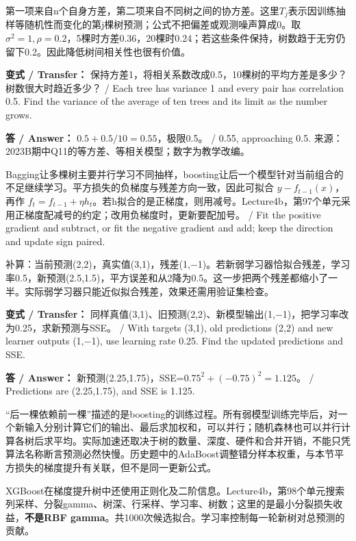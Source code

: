 第一项来自n个自身方差，第二项来自不同树之间的协方差。这里\(T_j\)表示因训练抽样等随机性而变化的第j棵树预测；公式不把偏差或观测噪声算成0。取\(\sigma^2=1,\rho=0.2\)，5棵时方差0.36，20棵时0.24；若这些条件保持，树数趋于无穷仍留下0.2。因此降低树间相关性也很有价值。


\textbf{变式 / Transfer：} 保持方差1，将相关系数改成0.5，10棵树的平均方差是多少？树数很大时趋近多少？ / Each tree has variance 1 and every pair has correlation 0.5. Find the variance of the average of ten trees and its limit as the number grows.


\textbf{答 / Answer：} \(0.5+0.5/10=0.55\)，极限0.5。 / 0.55, approaching 0.5. 来源：2023B期中Q11的等方差、等相关模型；数字为教学改编。





Bagging让多棵树主要并行学习不同抽样，boosting让后一个模型针对当前组合的不足继续学习。平方损失的负梯度与残差方向一致，因此可拟合 \(y-f_{t-1}(x)\)，再作 \(f_t=f_{t-1}+\eta h_t\)。若h拟合的是正梯度，则用减号。Lecture4b，第97个单元采用正梯度配减号的约定；改用负梯度时，更新要配加号。 / Fit the positive gradient and subtract, or fit the negative gradient and add; keep the direction and update sign paired.


补算：当前预测(2,2)，真实值(3,1)，残差(1,\ensuremath{-}1)。若新弱学习器恰拟合残差，学习率0.5，新预测(2.5,1.5)，平方误差和从2降为0.5。这一步把两个残差都缩小了一半。实际弱学习器只能近似拟合残差，效果还需用验证集检查。


\textbf{变式 / Transfer：} 同样真值(3,1)、旧预测(2,2)、新模型输出(1,\ensuremath{-}1)，把学习率改为0.25，求新预测与SSE。 / With targets (3,1), old predictions (2,2) and new learner outputs (1,\ensuremath{-}1), use learning rate 0.25. Find the updated predictions and SSE.


\textbf{答 / Answer：} 新预测(2.25,1.75)，SSE=\(0.75^2+(-0.75)^2=1.125\)。 / Predictions are (2.25,1.75), and SSE is 1.125.


“后一棵依赖前一棵”描述的是boosting的训练过程。所有弱模型训练完毕后，对一个新输入分别计算它们的输出、最后求加权和，可以并行；随机森林也可以并行计算各树后求平均。实际加速还取决于树的数量、深度、硬件和合并开销，不能只凭算法名称断言预测必然快慢。历史题中的AdaBoost调整错分样本权重，与本节平方损失的梯度提升有关联，但不是同一更新公式。


XGBoost在梯度提升树中还使用正则化及二阶信息。Lecture4b，第98个单元搜索列采样、分裂gamma、树深、行采样、学习率、树数；这里的是最小分裂损失收益，\textbf{不是RBF gamma}。共1000次候选拟合。学习率控制每一轮新树对总预测的贡献。


